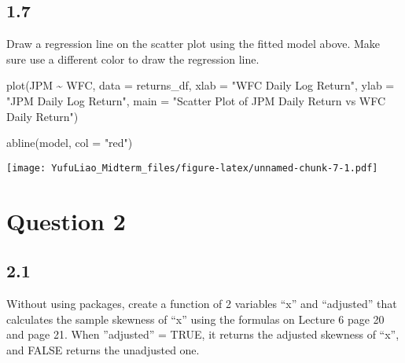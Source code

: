 \documentclass[
]{article}
\newenvironment{Shaded}{\begin{snugshade}}{\end{snugshade}}
\newcommand{\AttributeTok}[1]{\textcolor[rgb]{0.77,0.63,0.00}{#1}}
\newcommand{\FunctionTok}[1]{\textcolor[rgb]{0.00,0.00,0.00}{#1}}
\newcommand{\NormalTok}[1]{#1}
\newcommand{\SpecialCharTok}[1]{\textcolor[rgb]{0.00,0.00,0.00}{#1}}
\newcommand{\StringTok}[1]{\textcolor[rgb]{0.31,0.60,0.02}{#1}}
\begin{document}
\hypertarget{section-6}{%
\subsection{1.7}\label{section-6}}

Draw a regression line on the scatter plot using the fitted model above.
Make sure use a different color to draw the regression line.

\begin{Shaded}
\begin{Highlighting}[]
\FunctionTok{plot}\NormalTok{(JPM }\SpecialCharTok{\textasciitilde{}}\NormalTok{ WFC, }\AttributeTok{data =}\NormalTok{ returns\_df, }\AttributeTok{xlab =} \StringTok{"WFC Daily Log Return"}\NormalTok{, }\AttributeTok{ylab =} \StringTok{"JPM Daily Log Return"}\NormalTok{,}
     \AttributeTok{main =} \StringTok{"Scatter Plot of JPM Daily Return vs WFC Daily Return"}\NormalTok{)}

\FunctionTok{abline}\NormalTok{(model, }\AttributeTok{col =} \StringTok{"red"}\NormalTok{)}
\end{Highlighting}
\end{Shaded}

\texttt{[image: YufuLiao\_Midterm\_files/figure-latex/unnamed-chunk-7-1.pdf]}

\hypertarget{question-2}{%
\section{Question 2}\label{question-2}}

\hypertarget{section-7}{%
\subsection{2.1}\label{section-7}}

Without using packages, create a function of 2 variables ``x'' and
``adjusted'' that calculates the sample skewness of ``x'' using the
formulas on Lecture 6 page 20 and page 21. When ''adjusted'' = TRUE, it
returns the adjusted skewness of ``x'', and FALSE returns the unadjusted
one.
\end{document}
